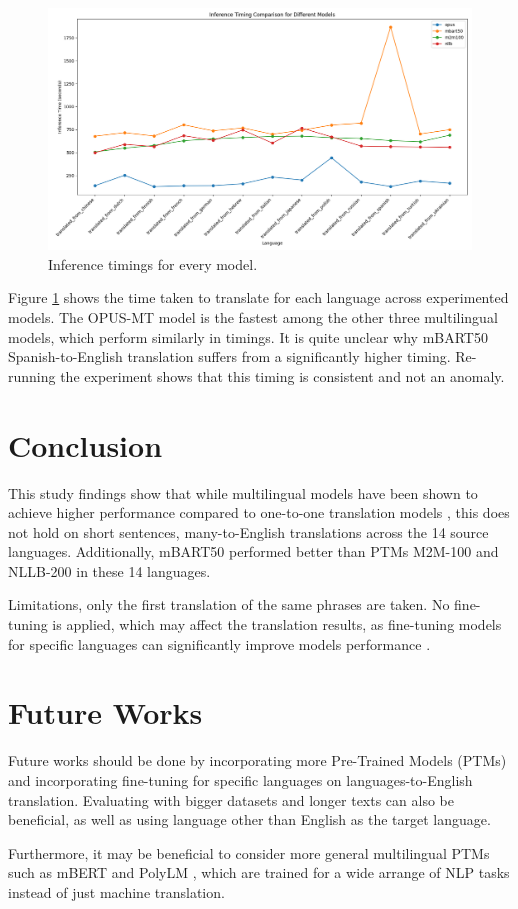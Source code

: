 \documentclass[a4paper]{article}
\begin{document}
\begin{figure}[htbp]
    \centering
    \includegraphics[width=0.9\linewidth]{figures/inference_timings.png}
    \caption{Inference timings for every model.}
    \label{fig:inference_timings}
\end{figure}

Figure \ref{fig:inference_timings} shows the time taken to translate for each language across experimented models. The OPUS-MT model is the fastest among the other three multilingual models, which perform similarly in timings. It is quite unclear why mBART50 Spanish-to-English translation suffers from a significantly higher timing. Re-running the experiment shows that this timing is consistent and not an anomaly.

\section{Conclusion}

This study findings show that while multilingual models have been shown to achieve higher performance compared to one-to-one translation models \cite{liu-2020-mbart}, this does not hold on short sentences, many-to-English translations across the 14 source languages. Additionally, mBART50 performed better than PTMs M2M-100 and NLLB-200 in these 14 languages.

Limitations, only the first translation of the same phrases are taken.
No fine-tuning is applied, which may affect the translation results, as fine-tuning models for specific languages can significantly improve models performance \cite{zhang-2023-fine-tuning}.

\section{Future Works}

Future works should be done by incorporating more Pre-Trained Models (PTMs) and incorporating fine-tuning for specific languages on languages-to-English translation. Evaluating with bigger datasets and longer texts can also be beneficial, as well as using language other than English as the target language.

Furthermore, it may be beneficial to consider more general multilingual PTMs such as mBERT \cite{wu-2020-mbert-are-all} and PolyLM \cite{wei-2023-polylm}, which are trained for a wide arrange of NLP tasks instead of just machine translation.

\printbibliography
\end{document}

